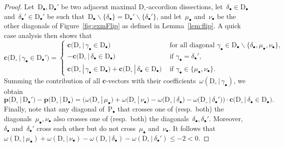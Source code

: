 \documentclass{amsart}
\theoremstyle{definition}
\renewcommand{\b}[1]{\mathbf{#1}} %
\newcommand{\ssm}{\smallsetminus} %
\newcommand{\fref}[1]{Figure~\ref{#1}} %
\newcommand{\polygon}{\mathrm{P}} %
\newcommand{\dissection}{\mathrm{D}} %
\newcommand{\bigcvector}[3]{\mathbf{c} \big( #1  \,|\, #3 \in #2 \big)} %
\newcommand{\rhs}[2]{\omega(#1 \,|\, #2)} %
\newcommand{\bigrhs}[2]{\omega \big( #1  \,|\, #2 \big)} %
\newcommand{\bigpoint}[2]{\mathbf{p} \big( #1  \,|\, #2 \big)} %
\begin{document}
\begin{proof}
Let~$\dissection_\bullet, \dissection_\bullet'$ be two adjacent maximal $\dissection_\circ$-accordion dissections, let~$\delta_\bullet \in \dissection_\bullet$ and~${\delta_\bullet' \in \dissection_\bullet'}$ be such that~$\dissection_\bullet \ssm \{\delta_\bullet\} = \dissection_\bullet' \ssm \{\delta_\bullet'\}$, and let~$\mu_\bullet$ and~$\nu_\bullet$ be the other diagonals of \fref{fig:exmFlip} as defined in Lemma~\ref{lem:flip}. A quick case analysis then shows that
\[
\bigcvector{\dissection_\circ}{\dissection_\bullet'}{\gamma_\bullet} = 
\begin{cases}
\bigcvector{\dissection_\circ}{\dissection_\bullet}{\gamma_\bullet} & \text{ for all diagonal } \gamma_\bullet \in \dissection_\bullet \ssm \{\delta_\bullet, \mu_\bullet, \nu_\bullet\}, \\
-\bigcvector{\dissection_\circ}{\dissection_\bullet}{\delta_\bullet} & \text{ if } \gamma_\bullet = \delta_\bullet', \\
\bigcvector{\dissection_\circ}{\dissection_\bullet}{\gamma_\bullet} + \bigcvector{\dissection_\circ}{\dissection_\bullet}{\delta_\bullet} & \text{ if } \gamma_\bullet \in \{\mu_\bullet, \nu_\bullet\}.
\end{cases}
\]
Summing the contribution of all $\b{c}$-vectors with their coefficients~$\rhs{\dissection_\circ}{\gamma_\bullet}$, we obtain
\[
\bigpoint{\dissection_\circ}{\dissection_\bullet'} - \bigpoint{\dissection_\circ}{\dissection_\bullet} = \big( \bigrhs{\dissection_\circ}{\mu_\bullet} + \bigrhs{\dissection_\circ}{\nu_\bullet} - \bigrhs{\dissection_\circ}{\delta_\bullet} - \bigrhs{\dissection_\circ}{\delta_\bullet'} \big) \cdot \bigcvector{\dissection_\circ}{\dissection_\bullet}{\delta_\bullet}.
\]
Finally, note that any diagonal of~$\polygon_\bullet$ that crosses one of (resp.~both) the diagonals~$\mu_\bullet, \nu_\bullet$ also crosses one of (resp.~both) the diagonals~$\delta_\bullet, \delta_\bullet'$. Moreover, $\delta_\bullet$ and~$\delta_\bullet'$ cross each other but do not cross~$\mu_\bullet$ and~$\nu_\bullet$. It follows that~$\rhs{\dissection_\circ}{\mu_\bullet} + \rhs{\dissection_\circ}{\nu_\bullet} - \rhs{\dissection_\circ}{\delta_\bullet} - \rhs{\dissection_\circ}{\delta_\bullet'} \le -2 < 0$.
\end{proof}
\end{document}
